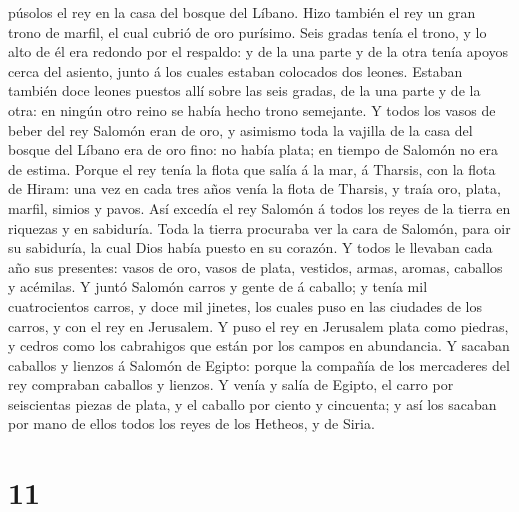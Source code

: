 púsolos el rey en la casa del bosque del Líbano.  Hizo
también el rey un gran trono de marfil, el cual cubrió de oro purísimo.
 Seis gradas tenía el trono, y lo alto de él era redondo
por el respaldo: y de la una parte y de la otra tenía apoyos cerca del
asiento, junto á los cuales estaban colocados dos leones. 
Estaban también doce leones puestos allí sobre las seis gradas, de la
una parte y de la otra: en ningún otro reino se había hecho trono
semejante.  Y todos los vasos de beber del rey Salomón eran
de oro, y asimismo toda la vajilla de la casa del bosque del Líbano era
de oro fino: no había plata; en tiempo de Salomón no era de estima.
 Porque el rey tenía la flota que salía á la mar, á
Tharsis, con la flota de Hiram: una vez en cada tres años venía la flota
de Tharsis, y traía oro, plata, marfil, simios y pavos. 
Así excedía el rey Salomón á todos los reyes de la tierra en riquezas y
en sabiduría.  Toda la tierra procuraba ver la cara de
Salomón, para oir su sabiduría, la cual Dios había puesto en su corazón.
 Y todos le llevaban cada año sus presentes: vasos de oro,
vasos de plata, vestidos, armas, aromas, caballos y acémilas.
 Y juntó Salomón carros y gente de á caballo; y tenía mil
cuatrocientos carros, y doce mil jinetes, los cuales puso en las
ciudades de los carros, y con el rey en Jerusalem.  Y puso
el rey en Jerusalem plata como piedras, y cedros como los cabrahigos que
están por los campos en abundancia.  Y sacaban caballos y
lienzos á Salomón de Egipto: porque la compañía de los mercaderes del
rey compraban caballos y lienzos.  Y venía y salía de
Egipto, el carro por seiscientas piezas de plata, y el caballo por
ciento y cincuenta; y así los sacaban por mano de ellos todos los reyes
de los Hetheos, y de Siria.

\hypertarget{section-10}{%
\section{11}\label{section-10}}

